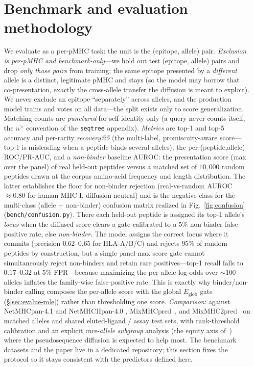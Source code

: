 \documentclass[11pt]{article}
\theoremstyle{oldplain}
\theoremstyle{oldrem}
\begin{document}
\section{Benchmark and evaluation methodology}\label{sec:bench}
We evaluate as a per-pMHC task: the unit is the (epitope, allele) pair. \emph{Exclusion is per-pMHC
and benchmark-only}---we hold out test (epitope, allele) pairs and drop \emph{only those pairs} from
training; the same epitope presented by a \emph{different} allele is a distinct, legitimate pMHC and
stays (so the model may borrow that co-presentation, exactly the cross-allele transfer the diffusion
is meant to exploit). We never exclude an epitope ``separately'' across alleles, and the production
model trains and votes on all data---the split exists only to score generalization. Matching counts
are \emph{punctured} for self-identity only (a query never counts itself, the $n^{>}$ convention of
the \texttt{seqtree} appendix). \emph{Metrics} are top-1 and top-5 accuracy and per-rarity \emph{recovery@5} (the
multi-label, promiscuity-aware score---top-1 is misleading when a peptide binds several alleles), the
per-(peptide,allele) ROC/PR-AUC, and a \emph{non-binder} baseline AUROC: the presentation score
(max over the panel) of real held-out peptides versus a matched set of $10{,}000$ random peptides
drawn at the corpus amino-acid frequency and length distribution. The latter establishes the floor
for non-binder rejection (real-vs-random AUROC $\approx0.80$ for human MHC-I, diffusion-neutral) and
is the negative class for the multi-class (allele $+$ non-binder) confusion matrix realized in
Fig.~\ref{fig:confusion} (\texttt{bench/confusion.py}). There each held-out peptide is assigned its
top-1 allele's \emph{locus} when the diffused score clears a gate calibrated to a $5\%$ non-binder
false-positive rate, else \emph{non-binder}. The model assigns the correct locus where it commits
(precision $0.62$--$0.65$ for HLA-A/B/C) and rejects $95\%$ of random peptides by construction, but a
single panel-max score gate cannot simultaneously reject non-binders and retain rare positives---top-1
recall falls to $0.17$--$0.32$ at $5\%$ FPR---because maximizing the per-allele log-odds over
$\sim$100 alleles inflates the family-wise false-positive rate. This is exactly why binder/non-binder
calling composes the per-allele score with the global $E_{\mathrm{glob}}$ gate (\S\ref{sec:evalue-role})
rather than thresholding one score. \emph{Comparison}: against NetMHCpan-4.1 and NetMHCIIpan-4.0
\cite{Reynisson2020}, MixMHCpred~\cite{BassaniSternberg2017}, and MixMHC2pred~\cite{Racle2019} on
matched alleles and shared eluted-ligand / assay test sets, with rank-threshold calibration and an
explicit \emph{rare-allele subgroup} analysis (the equity axis of~\cite{Glynn2025}) where the
pseudosequence diffusion is expected to help most. The benchmark datasets and the paper live in a
dedicated repository; this section fixes the protocol so it stays consistent with the predictors
defined here.
\end{document}

